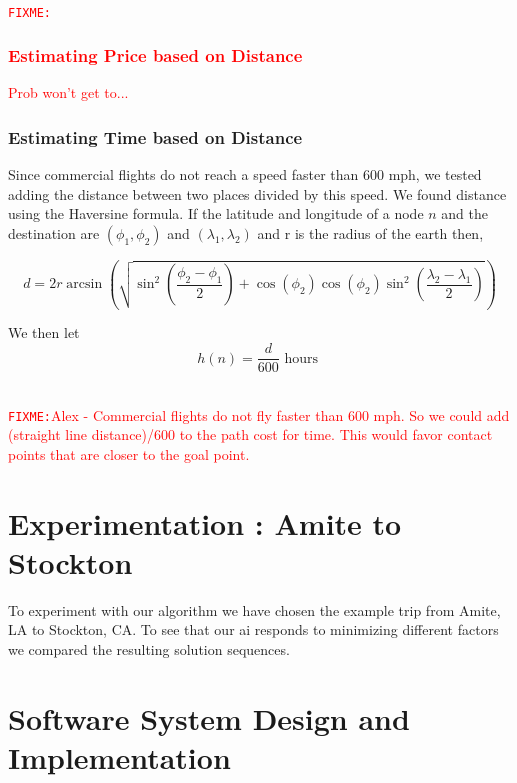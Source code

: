 \documentclass[11pt]{article}
\newcommand{\FIXME}[1]{ \ \\ \hspace* {-1.5 cm}
  \textcolor{red}{\texttt{FIXME:}#1} \medskip\par}
\begin{document}
\FIXME{\subsubsection{Estimating Price based on Distance} Prob won't get to...}

\subsubsection{Estimating Time based on Distance}

Since commercial flights do not reach a speed faster than 600 mph, we tested adding the distance between two places divided by this speed. 
We found distance using the Haversine formula. If the latitude and longitude of a node $n$ and the destination are $(\phi_1,\phi_2)$ and $(\lambda_1,\lambda_2)$ and r is the radius of the earth then,

$$d = 2r \arcsin \left( \sqrt{\sin^2 \left(\frac{\phi_2-\phi_1}{2} \right)+\cos(\phi_2) \cos(\phi_2) \sin^2 \left( \frac{\lambda_2 - \lambda_1}{2} \right)} \right)$$

We then let
$$h(n) = \frac{d}{600} \text{ hours }$$

\FIXME{Alex - Commercial flights do not fly faster than 600 mph. So we could add (straight line distance)/600 to the path cost for time. This would favor contact points that are closer to the goal point.}


\section{Experimentation : Amite to Stockton}

To experiment with our algorithm we have chosen the example trip from Amite, LA to Stockton, CA. To see that our ai responds to minimizing different factors we compared the resulting solution sequences. 




\pagebreak

\section{Software System Design and Implementation}
\end{document}
